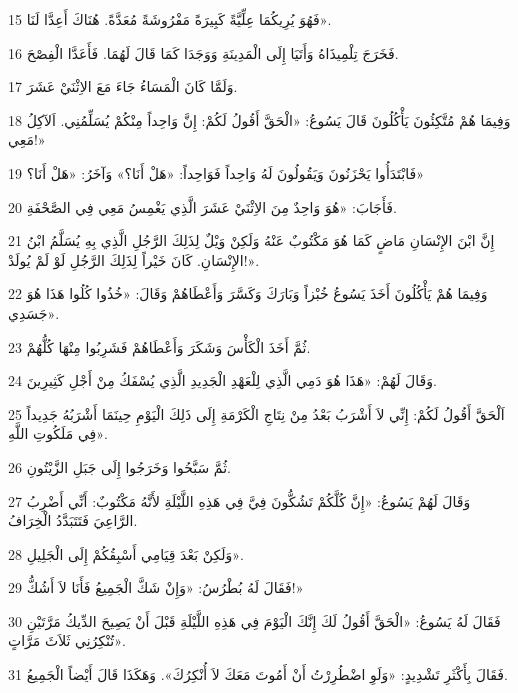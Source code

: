 \par 15 فَهُوَ يُرِيكُمَا عِلِّيَّةً كَبِيرَةً مَفْرُوشَةً مُعَدَّةً. هُنَاكَ أَعِدَّا لَنَا».
\par 16 فَخَرَجَ تِلْمِيذَاهُ وَأَتَيَا إِلَى الْمَدِينَةِ وَوَجَدَا كَمَا قَالَ لَهُمَا. فَأَعَدَّا الْفِصْحَ.
\par 17 وَلَمَّا كَانَ الْمَسَاءُ جَاءَ مَعَ الاِثْنَيْ عَشَرَ.
\par 18 وَفِيمَا هُمْ مُتَّكِئُونَ يَأْكُلُونَ قَالَ يَسُوعُ: «الْحَقَّ أَقُولُ لَكُمْ: إِنَّ وَاحِداً مِنْكُمْ يُسَلِّمُنِي. اَلآكِلُ مَعِي!»
\par 19 فَابْتَدَأُوا يَحْزَنُونَ وَيَقُولُونَ لَهُ وَاحِداً فَوَاحِداً: «هَلْ أَنَا؟» وَآخَرُ: «هَلْ أَنَا؟»
\par 20 فَأَجَابَ: «هُوَ وَاحِدٌ مِنَ الاِثْنَيْ عَشَرَ الَّذِي يَغْمِسُ مَعِي فِي الصَّحْفَةِ.
\par 21 إِنَّ ابْنَ الإِنْسَانِ مَاضٍ كَمَا هُوَ مَكْتُوبٌ عَنْهُ وَلَكِنْ وَيْلٌ لِذَلِكَ الرَّجُلِ الَّذِي بِهِ يُسَلَّمُ ابْنُ الإِنْسَانِ. كَانَ خَيْراً لِذَلِكَ الرَّجُلِ لَوْ لَمْ يُولَدْ!».
\par 22 وَفِيمَا هُمْ يَأْكُلُونَ أَخَذَ يَسُوعُ خُبْزاً وَبَارَكَ وَكَسَّرَ وَأَعْطَاهُمْ وَقَالَ: «خُذُوا كُلُوا هَذَا هُوَ جَسَدِي».
\par 23 ثُمَّ أَخَذَ الْكَأْسَ وَشَكَرَ وَأَعْطَاهُمْ فَشَرِبُوا مِنْهَا كُلُّهُمْ.
\par 24 وَقَالَ لَهُمْ: «هَذَا هُوَ دَمِي الَّذِي لِلْعَهْدِ الْجَدِيدِ الَّذِي يُسْفَكُ مِنْ أَجْلِ كَثِيرِينَ.
\par 25 اَلْحَقَّ أَقُولُ لَكُمْ: إِنِّي لاَ أَشْرَبُ بَعْدُ مِنْ نِتَاجِ الْكَرْمَةِ إِلَى ذَلِكَ الْيَوْمِ حِينَمَا أَشْرَبُهُ جَدِيداً فِي مَلَكُوتِ اللَّهِ».
\par 26 ثُمَّ سَبَّحُوا وَخَرَجُوا إِلَى جَبَلِ الزَّيْتُونِ.
\par 27 وَقَالَ لَهُمْ يَسُوعُ: «إِنَّ كُلَّكُمْ تَشُكُّونَ فِيَّ فِي هَذِهِ اللَّيْلَةِ لأَنَّهُ مَكْتُوبٌ: أَنِّي أَضْرِبُ الرَّاعِيَ فَتَتَبَدَّدُ الْخِرَافُ.
\par 28 وَلَكِنْ بَعْدَ قِيَامِي أَسْبِقُكُمْ إِلَى الْجَلِيلِ».
\par 29 فَقَالَ لَهُ بُطْرُسُ: «وَإِنْ شَكَّ الْجَمِيعُ فَأَنَا لاَ أَشُكُّ!»
\par 30 فَقَالَ لَهُ يَسُوعُ: «الْحَقَّ أَقُولُ لَكَ إِنَّكَ الْيَوْمَ فِي هَذِهِ اللَّيْلَةِ قَبْلَ أَنْ يَصِيحَ الدِّيكُ مَرَّتَيْنِ تُنْكِرُنِي ثَلاَثَ مَرَّاتٍ».
\par 31 فَقَالَ بِأَكْثَرِ تَشْدِيدٍ: «وَلَوِ اضْطُرِرْتُ أَنْ أَمُوتَ مَعَكَ لاَ أُنْكِرُكَ». وَهَكَذَا قَالَ أَيْضاً الْجَمِيعُ.
